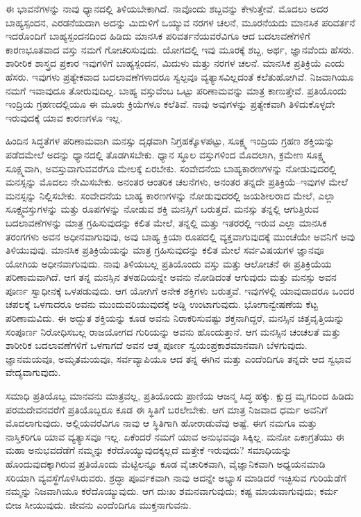 \vskip 5pt

ಈ ಭಾವನೆಗಳನ್ನು ನಾವು ಧ್ಯಾನದಲ್ಲಿ ತಿಳಿಯಬೇಕಾಗಿದೆ. ನಾವೊಂದು ಶಬ್ದವನ್ನು ಕೇಳುತ್ತೇವೆ. ಮೊದಲು ಅದರ ಬಾಹ್ಯಸ್ಪಂದನ, ಎರಡನೆಯದಾಗಿ ಅದನ್ನು ಮಿದುಳಿಗೆ ಒಯ್ಯುವ ನರಗಳ ಚಲನೆ, ಮೂರನೆಯದು ಮಾನಸಿಕ ಪರಿವರ್ತನೆ ಇದರೊಂದಿಗೆ ಬಾಹ್ಯಸ್ಪಂದನದಿಂದ ಹಿಡಿದು ಮಾನಸಿಕ ಪರಿವರ್ತನೆಯವರೆವಿಗೂ ಆದ ಬದಲಾವಣೆಗಳಿಗೆ ಕಾರಣಭೂತವಾದ ವಸ್ತು ನಮಗೆ ಗೋಚರಿಸುವುದು. ಯೋಗದಲ್ಲಿ ಇವು ಮೂರಕ್ಕೆ ಶಬ್ದ, ಅರ್ಥ, ಜ್ಞಾನವೆಂದು ಹೆಸರು. ಶಾರೀರಿಕ ಶಾಸ್ತ್ರದ ಪ್ರಕಾರ ಇವುಗಳಿಗೆ ಬಾಹ್ಯಸ್ಪಂದನ, ಮಿದುಳು ಮತ್ತು ನರಗಳ ಚಲನೆ. ಮಾನಸಿಕ ಪ್ರತಿಕ್ರಿಯೆ ಎಂದು ಹೆಸರು. ಇವುಗಳು ಪ್ರತ್ಯೇಕವಾದ ಬದಲಾವಣೆಗಳಾದರೂ ಸ್ವಲ್ಪವೂ ವ್ಯತ್ಯಾಸವಿಲ್ಲದಂತೆ ಕಲೆತುಹೋಗಿವೆ. ನಿಜವಾಗಿಯೂ ನಮಗೆ ಇವಾವುದೂ ತೋರುವುದಿಲ್ಲ. ಬಾಹ್ಯ ವಸ್ತುವೆಂಬ ಒಟ್ಟು ಪರಿಣಾಮವನ್ನು ಮಾತ್ರ ಕಾಣುತ್ತೇವೆ. ಪ್ರತಿಯೊಂದು ಇಂದ್ರಿಯ ಗ್ರಹಣದಲ್ಲಿಯೂ ಈ ಮೂರು ಕ್ರಿಯೆಗಳೂ ಕಲೆತಿವೆ. ನಾವು ಅವುಗಳನ್ನು ಪ್ರತ್ಯೇಕವಾಗಿ ತಿಳಿದುಕೊಳ್ಳದೇ ಇರುವುದಕ್ಕೆ ಯಾವ ಕಾರಣಗಳೂ ಇಲ್ಲ. 

\vskip 5pt

ಹಿಂದಿನ ಸಿದ್ಧತೆಗಳ ಪರಿಣಾಮವಾಗಿ ಮನಸ್ಸು ದೃಢವಾಗಿ ನಿಗ್ರಹಕ್ಕೊಳಪಟ್ಟು, ಸೂಕ್ಷ್ಮ ಇಂದ್ರಿಯ ಗ್ರಹಣ ಶಕ್ತಿಯನ್ನು ಪಡೆದಮೇಲೆ ಅದನ್ನು ಧ್ಯಾನದಲ್ಲಿ ತೊಡಗಿಸಬೇಕು. ಧ್ಯಾನ ಸ್ಥೂಲ ವಸ್ತುಗಳಿಂದ ಮೊದಲಾಗಿ, ಕ್ರಮೇಣ ಸೂಕ್ಷ್ಮ ಸೂಕ್ಷ್ಮವಾಗಿ, ಅವಸ್ತುವಾಗುವವರೆಗೂ ಮೇಲಕ್ಕೆ ಏರಬೇಕು. ಸಂವೇದನೆಯ ಬಾಹ್ಯಕಾರಣಗಳನ್ನು ನೋಡುವುದರಲ್ಲಿ ಮನಸ್ಸನ್ನು ಮೊದಲು ನೇಮಿಸಬೇಕು. ಅನಂತರ ಆಂತರಿಕ ಚಲನೆಗಳು, ಅನಂತರ ತನ್ನದೇ ಪ್ರತಿಕ್ರಿಯೆ–ಇವುಗಳ ಮೇಲೆ ಮನಸ್ಸನ್ನು ನಿಲ್ಲಿಸಬೇಕು. ಸಂವೇದನೆಯ ಬಾಹ್ಯ ಕಾರಣಗಳನ್ನು ನೋಡುವುದರಲ್ಲಿ ಜಯಶೀಲರಾದ ಮೇಲೆ, ಎಲ್ಲಾ ಸೂಕ್ಷ್ಮವಸ್ತುಗಳನ್ನು ಮತ್ತು ರೂಪಗಳನ್ನು ನೋಡುವ ಶಕ್ತಿ ಮನಸ್ಸಿಗೆ ಬರುತ್ತದೆ. ಮನಸ್ಸು ತನ್ನಲ್ಲಿ ಆಗುತ್ತಿರುವ ಬದಲಾವಣೆಗಳನ್ನು ಮಾತ್ರ ಗ್ರಹಿಸುವುದನ್ನು ಕಲಿತ ಮೇಲೆ, ತನ್ನಲ್ಲಿ ಮತ್ತು ಇತರರಲ್ಲಿ ಇರುವ ಎಲ್ಲಾ ಮಾನಸಿಕ ತರಂಗಗಳು ಅವನ ಅಧೀನವಾಗುವುವು, ಅವು ಬಾಹ್ಯ ಕ್ರಿಯಾ ರೂಪದಲ್ಲಿ ವ್ಯಕ್ತವಾಗುವುದಕ್ಕೆ ಮುಂಚೆಯೇ ಅವನಿಗೆ ಅವು ತಿಳಿಯುವುವು. ಮಾನಸಿಕ ಪ್ರತಿಕ್ರಿಯೆಯನ್ನು ಮಾತ್ರ ಗ್ರಹಿಸುವುದನ್ನು ಕಲಿತ ಮೇಲೆ ಸರ್ವವಿಷಯಗಳ ಜ್ಞಾನವೂ ಯೋಗಿಯ ಅಧೀನವಾಗುವುದು. ನಾವು ತಿಳಿಯಬಲ್ಲ ಪ್ರತಿಯೊಂದು ವಸ್ತು ಮತ್ತು ಆಲೋಚನೆ ಈ ಪ್ರತಿಕ್ರಿಯೆಯ ಪರಿಣಾಮವಾಗಿದೆ. ಆಗ ತನ್ನ ಮನಸ್ಸಿನ ತಳಹದಿಯನ್ನೇ ಅವನು ನೋಡಿದಂತೆ ಆಗುವುದು ಮತ್ತು ಮನಸ್ಸು ಅವನ ಪೂರ್ಣ ಸ್ವಾಧೀನಕ್ಕೆ ಒಳಪಡುವುದು. ಆಗ ಯೋಗಿಗೆ ಅನೇಕ ಶಕ್ತಿಗಳು ಬರುತ್ತವೆ. ಇವುಗಳಲ್ಲಿ ಯಾವುದಾದರೂ ಒಂದರ ಚಪಲಕ್ಕೆ ಒಳಗಾದರೂ ಅವನು ಮುಂದುವರಿಯುವುದಕ್ಕೆ ಅಡ್ಡಿ ಉಂಟಾಗುವುದು. ಭೋಗಾನ್ವೇಷಣೆಯ ಕೆಟ್ಟ ಪರಿಣಾಮವಿದು. ಈ ಅದ್ಭುತ ಶಕ್ತಿಯನ್ನು ಕೂಡ ಅವನು ನಿರಾಕರಿಸುವಷ್ಟು ಶಕ್ತನಾಗಿದ್ದರೆ, ಮನಸ್ಸಿನ ಚಿತ್ತವೃತ್ತಿಯನ್ನು ಸಂಪೂರ್ಣ ನಿರೋಧಿಸಬಲ್ಲ ರಾಜಯೋಗದ ಗುರಿಯನ್ನು ಅವನು ಹೊಂದುತ್ತಾನೆ. ಆಗ ಮನಸ್ಸಿನ ಚಂಚಲತೆ ಮತ್ತು ಶಾರೀರಿಕ ಬದಲಾವಣೆಗಳಿಗೆ ಒಳಗಾಗದೆ ಅವನ ಆತ್ಮ ಪೂರ್ಣ ಸ್ವಯಂಪ್ರಕಾಶಮಾನವಾಗಿ ಬೆಳಗುವುದು. ಜ್ಞಾನಮಯವೂ, ಅಮೃತಮಯವೂ, ಸರ್ವವ್ಯಾಪಿಯೂ ಆದ ತನ್ನ ಈಗಿನ ಮತ್ತು ಎಂದೆಂದಿಗೂ ತನ್ನದೇ ಆದ ಸ್ವಭಾವ ವೇದ್ಯವಾಗುವುದು. 

\vskip 5pt

ಸಮಾಧಿ ಪ್ರತಿಯೊಬ್ಬ ಮಾನವನು ಮಾತ್ರವಲ್ಲ, ಪ್ರತಿಯೊಂದು ಪ್ರಾಣಿಯ ಆಜನ್ಮ ಸಿದ್ಧ ಹಕ್ಕು. ಕ್ಷುದ್ರ ಮೃಗದಿಂದ ಹಿಡಿದು ಪರಮದೇವನವರೆಗೆ ಪ್ರತಿಯೊಬ್ಬರೂ ಕೂಡ ಈ ಸ್ಥಿತಿಗೆ ಬರಲೇಬೇಕು. ಆಗ ಮಾತ್ರ ನಿಜವಾದ ಧರ್ಮ ಅವನಿಗೆ ಮೊದಲಾಗುವುದು. ಅಲ್ಲಿಯವರೆವಿಗೂ ನಾವು ಆ ಸ್ಥಿತಿಗಾಗಿ ಹೋರಾಡುವೆವು ಅಷ್ಟೆ. ಈಗ ನಮಗೂ ಮತ್ತು ನಾಸ್ತಿಕರಿಗೂ ಯಾವ ವ್ಯತ್ಯಾಸವೂ ಇಲ್ಲ. ಏಕೆಂದರೆ ನಮಗೆ ಯಾವ ಅನುಭವವೂ ಸಿಕ್ಕಿಲ್ಲ. ಮನೋ ಏಕಾಗ್ರತೆಯು ಈ ಮಹಾ ಅನುಭವದೆಡೆಗೆ ನಮ್ಮನ್ನು ಕರೆದೊಯ್ಯುವುದಕ್ಕಲ್ಲದೆ ಮತ್ತೇಕೆ ಇರುವುದು? ಸಮಾಧಿಯನ್ನು ಹೊಂದುವುದಕ್ಕಾಗಿರುವ ಪ್ರತಿಯೊಂದು ಮೆಟ್ಟಿಲನ್ನೂ ಕೂಡ ವೈಚಾರಿಕವಾಗಿ, ವೈಜ್ಞಾನಿಕವಾಗಿ ಅಧ್ಯಯನಮಾಡಿ ಸರಿಯಾಗಿ ವ್ಯವಸ್ಥೆಗೊಳಿಸಿರುವರು. ಶ್ರದ್ಧಾ ಪೂರ್ವಕವಾಗಿ ನಾವು ಅದನ್ನೇ ಅಭ್ಯಾಸ ಮಾಡಿದರೆ ಇಚ್ಛಿಸುವ ಗುರಿಯೆಡೆಗೆ ನಮ್ಮನ್ನು ನಿಜವಾಗಿಯೂ ಕರೆದೊಯ್ಯುವುದು. ಆಗ ದುಃಖ ಶಮನವಾಗುವುದು; ಕಷ್ಟ ಮಾಯವಾಗುವುದು; ಕರ್ಮ ಬೀಜ ಸೀಯುವುದು. ಜೀವನು ಎಂದೆಂದಿಗೂ ಮುಕ್ತನಾಗುವನು.

